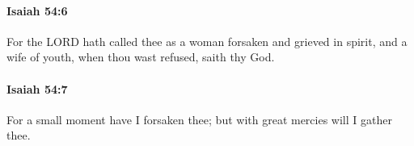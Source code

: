 		\paragraph{Isaiah 54:6} %
			\label{ISAIAH-54-6}

			For the LORD hath called thee as a woman forsaken and grieved in spirit, and a wife of youth, when thou wast refused, saith thy God.


		\paragraph{Isaiah 54:7} %
			\label{ISAIAH-54-7}

			For a small moment have I forsaken thee; but with great mercies will I gather thee.


